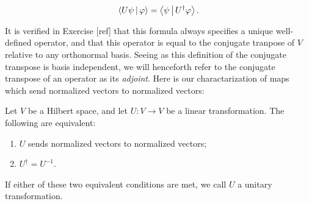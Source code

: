 $$\Braket{ U \psi  | \varphi}=\Braket{\psi | U^\dagger \varphi}.$$

It is verified in Exercise [ref] that this formula always specifies a unique well-defined operator, and that this operator is equal to the conjugate tranpose of $V$ relative to any orthonormal basis. Seeing as this definition of the conjugate transpose is basis independent, we will henceforth refer to the conjugate transpose of an operator as its \textit{adjoint}. Here is our charactarization of maps which send normalized vectors to normalized vectors:

\begin{proposition}\label{unitary equivilance} Let $V$ be a Hilbert space, and let $U:V\to V$ be a linear transformation. The following are equivalent:

\begin{enumerate}
\item $U$ sends normalized vectors to normalized vectors;
\item $U^{\dagger}=U^{-1}$.
\end{enumerate}

If either of these two equivalent conditions are met, we call $U$ a unitary transformation.
\end{proposition}
